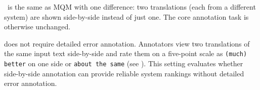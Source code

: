\textbf{\sxsmqm}~is the same as MQM with one difference: two translations (each from a different system) are shown side-by-side instead of just one. The core annotation task is otherwise unchanged.


\textbf{\sxsqr} does not require detailed error annotation. Annotators view two translations of the same input text side-by-side and rate them on a five-point scale as \texttt{(much) better} on one side or \texttt{about the same} (see ). This setting evaluates whether side-by-side annotation can provide reliable system rankings without detailed error annotation.








